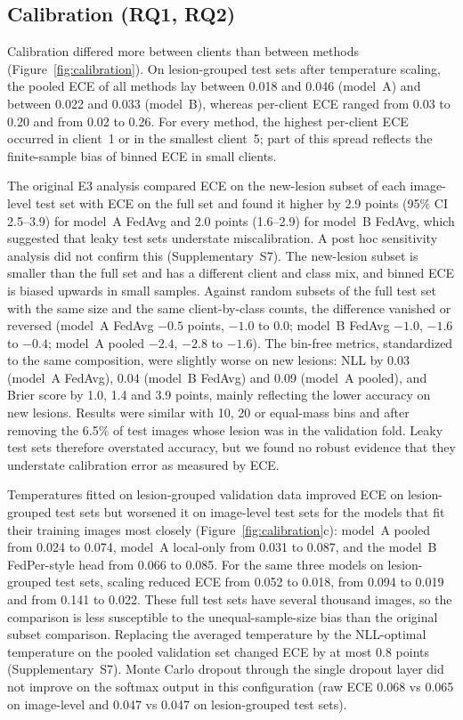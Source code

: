 \documentclass[VANCOUVER,Times1COL]{WileyNJDv5}
\begin{document}
\subsection{Calibration (RQ1, RQ2)}
\label{sec:res-calibration}

Calibration differed more between clients than between methods (Figure~\ref{fig:calibration}). On
lesion-grouped test sets after temperature scaling, the pooled ECE of all methods lay between 0.018 and
0.046 (model~A) and between 0.022 and 0.033 (model~B), whereas per-client ECE ranged from 0.03 to 0.20
and from 0.02 to 0.26. For every method, the highest per-client ECE occurred in client~1 or in the
smallest client~5; part of this spread reflects the finite-sample bias of binned ECE in small clients.

The original E3 analysis compared ECE on the new-lesion subset of each image-level test set with ECE on the
full set and found it higher by 2.9 points (95\% CI 2.5--3.9) for model~A FedAvg and 2.0 points (1.6--2.9)
for model~B FedAvg, which suggested that leaky test sets understate miscalibration. A post hoc sensitivity
analysis did not confirm this (Supplementary~S7). The new-lesion subset is smaller than the full set and
has a different client and class mix, and binned ECE is biased upwards in small samples. Against random
subsets of the full test set with the same size and the same client-by-class counts, the difference
vanished or reversed (model~A FedAvg $-0.5$ points, $-1.0$ to 0.0; model~B FedAvg $-1.0$, $-1.6$ to
$-0.4$; model~A pooled $-2.4$, $-2.8$ to $-1.6$). The bin-free metrics, standardized to the same
composition, were slightly worse on new lesions: NLL by 0.03 (model~A FedAvg), 0.04 (model~B FedAvg) and
0.09 (model~A pooled), and Brier score by 1.0, 1.4 and 3.9 points, mainly reflecting the lower accuracy on
new lesions. Results were similar with 10, 20 or equal-mass bins and after removing the 6.5\% of test
images whose lesion was in the validation fold. Leaky test sets therefore overstated accuracy, but we found
no robust evidence that they understate calibration error as measured by ECE.

Temperatures fitted on lesion-grouped validation data improved ECE on lesion-grouped test sets but worsened
it on image-level test sets for the models that fit their training images most closely
(Figure~\ref{fig:calibration}c): model~A pooled from 0.024 to 0.074, model~A local-only from 0.031 to 0.087,
and the model~B FedPer-style head from 0.066 to 0.085. For the same three models on lesion-grouped test
sets, scaling reduced ECE from 0.052 to 0.018, from 0.094 to 0.019 and from 0.141 to 0.022. These full test
sets have several thousand images, so the comparison is less susceptible to the unequal-sample-size bias than the original subset comparison. Replacing
the averaged temperature by the NLL-optimal temperature on the pooled validation set changed ECE by at
most 0.8 points (Supplementary~S7). Monte Carlo dropout through the single dropout layer did not
improve on the softmax output in this configuration (raw ECE 0.068 vs 0.065 on image-level and 0.047 vs
0.047 on lesion-grouped test sets).
\end{document}
